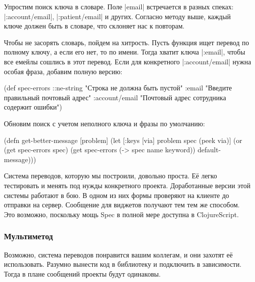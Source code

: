 
Упростим поиск ключа в словаре. Поле \spverb|email| встречается в разных спеках:
\spverb|:account/email|, \spverb|:patient/email| и других. Согласно методу выше,
каждый ключе должен быть в словаре, что склоняет нас к повторам.

Чтобы не засорять словарь, пойдем на хитрость. Пусть функция ищет перевод по
полному ключу, а если его нет, то по имени. Тогда хватит ключа \spverb|:email|,
чтобы все емейлы сошлись в этот перевод. Если для конкретного
\spverb|:account/email| нужна особая фраза, добавим полную версию:

  \begin{clojure}
(def spec-errors
  {::ne-string "Строка не должна быть пустой"
   :email "Введите правильный почтовый адрес"
   :account/email "Почтовый адрес сотрудника содержит ошибки"})
  \end{clojure}

\noindent
Обновим поиск с учетом неполного ключа и фразы по умолчанию:

\begin{english}
  \begin{clojure}
(defn get-better-message
  [problem]
  (let [{:keys [via]} problem
        spec (peek via)]
    (or (get spec-errors spec)
        (get spec-errors (-> spec name keyword))
        default-message)))
  \end{clojure}
\end{english}


Система переводов, которую мы построили, довольно проста. Е\"{е} легко тестировать и
менять под нужды конкретного проекта. Доработанные версии этой системы работают
в бою. В одном из них формы проверяют на клиенте до отправки на
сервер. Сообщение для виджетов получают тем тем же способом. Это возможно,
поскольку мощь Spec в полной мере доступна в ClojureScript.

\subsubsection{Мультиметод}

Возможно, система переводов понравится вашим коллегам, и они захотят е\"{е}
использовать. Разумно вынести код в библиотеку и подключить в зависимости. Тогда
в плане сообщений проекты будут одинаковы.

